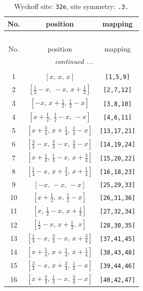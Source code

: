 \documentclass[fleqn,8pt]{jsarticle}
\begin{document}
\begin{longtable}{ccc}
\caption{Wyckoff site: {\tt 32e}, site symmetry: {\tt .3.}}
 \\
 \hline \hline
No. & position & mapping \\ \hline \endfirsthead

\multicolumn{2}{l}{\tablename\ \thetable{}} \\
 \hline \hline
No. & position & mapping \\ \hline \endhead

 \hline \hline
\multicolumn{2}{r}{\footnotesize\it continued ...} \\ \endfoot

 \hline \hline
\multicolumn{2}{r}{} \\ \endlastfoot

1 & $\left[ x,\, x,\, x \right]$ & {\tt [1,5,9]} \\ \hline
2 & $\left[ \frac{1}{2} - x,\, - x,\, x + \frac{1}{2} \right]$ & {\tt [2,7,12]} \\ \hline
3 & $\left[ - x,\, x + \frac{1}{2},\, \frac{1}{2} - x \right]$ & {\tt [3,8,10]} \\ \hline
4 & $\left[ x + \frac{1}{2},\, \frac{1}{2} - x,\, - x \right]$ & {\tt [4,6,11]} \\ \hline
5 & $\left[ x + \frac{3}{4},\, x + \frac{1}{4},\, \frac{1}{4} - x \right]$ & {\tt [13,17,21]} \\ \hline
6 & $\left[ \frac{3}{4} - x,\, \frac{3}{4} - x,\, \frac{3}{4} - x \right]$ & {\tt [14,19,24]} \\ \hline
7 & $\left[ x + \frac{1}{4},\, \frac{1}{4} - x,\, x + \frac{3}{4} \right]$ & {\tt [15,20,22]} \\ \hline
8 & $\left[ \frac{1}{4} - x,\, x + \frac{3}{4},\, x + \frac{1}{4} \right]$ & {\tt [16,18,23]} \\ \hline
9 & $\left[ - x,\, - x,\, - x \right]$ & {\tt [25,29,33]} \\ \hline
10 & $\left[ x + \frac{1}{2},\, x,\, \frac{1}{2} - x \right]$ & {\tt [26,31,36]} \\ \hline
11 & $\left[ x,\, \frac{1}{2} - x,\, x + \frac{1}{2} \right]$ & {\tt [27,32,34]} \\ \hline
12 & $\left[ \frac{1}{2} - x,\, x + \frac{1}{2},\, x \right]$ & {\tt [28,30,35]} \\ \hline
13 & $\left[ \frac{1}{4} - x,\, \frac{3}{4} - x,\, x + \frac{3}{4} \right]$ & {\tt [37,41,45]} \\ \hline
14 & $\left[ x + \frac{1}{4},\, x + \frac{1}{4},\, x + \frac{1}{4} \right]$ & {\tt [38,43,48]} \\ \hline
15 & $\left[ \frac{3}{4} - x,\, x + \frac{3}{4},\, \frac{1}{4} - x \right]$ & {\tt [39,44,46]} \\ \hline
16 & $\left[ x + \frac{3}{4},\, \frac{1}{4} - x,\, \frac{3}{4} - x \right]$ & {\tt [40,42,47]} \\
\end{longtable}
\end{document}
